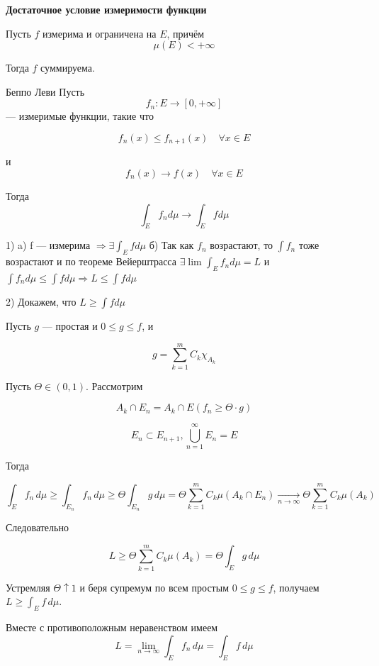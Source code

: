\documentclass[12pt,a4paper]{article}
\begin{document}
\begin{corollary}
    \textbf{Достаточное условие измеримости функции}

    Пусть $f$ измерима и ограничена на $E$, причём
    \[
        \mu(E)<+\infty
    \]

    Тогда $f$ суммируема.
\end{corollary}

\begin{theorem}{Беппо Леви}
    Пусть
    \[
        f_n:E\to[0,+\infty]
    \]
    — измеримые функции, такие что

    \[
        f_n(x)\leq f_{n+1}(x)
        \quad
        \forall x\in E
    \]

    и
    \[
        f_n(x)\to f(x)
        \quad
        \forall x\in E
    \]

    Тогда
    \[
        \int_E f_n d\mu
        \longrightarrow
        \int_E f d\mu
    \]
\end{theorem}

\begin{proofbox}{}

    1) a) f — измерима $\Longrightarrow \exists \int_E fd\mu$
    б) Так как $f_n$ возрастают, то $\int f_n$ тоже возрастают и по теореме Вейерштрасса $\exists \lim\int_E f_nd\mu = L$ и
    $\int f_nd\mu \leq \int fd\mu \Longrightarrow L \leq \int fd\mu$

    2) Докажем, что $L \geq \int fd\mu$

    Пусть $g$ — простая и $0 \leq g \leq f$, и

    \[
        g = \sum_{k=1}^m C_k \chi_{A_k}
    \]

    Пусть $\Theta \in (0, 1) $. Рассмотрим

    \[
        A_k \cap E_n = A_k \cap E(f_n\geq \Theta \cdot g)
    \]

    \[
        E_n \subset E_{n+1}, \bigcup_{n=1}^{\infty}E_n = E
    \]

    Тогда

    \[
        \int_E f_n\,d\mu\geq\int_{E_n}f_n\,d\mu\geq\Theta\int_{E_n}g\,d\mu
        =\Theta\sum_{k=1}^{m}C_k\mu(A_k\cap E_n)
        \xrightarrow[n\to\infty]{}\Theta\sum_{k=1}^{m}C_k\mu(A_k)
    \]

    Следовательно

    \[
        L \geq \Theta\sum_{k=1}^{m}C_k\mu(A_k)=\Theta\int_E g\,d\mu
    \]

    Устремляя $\Theta\uparrow1$ и беря супремум по всем простым $0\leq g\leq f$, получаем $L\geq\int_E f\,d\mu$.

    Вместе с противоположным неравенством имеем
    \[
        L=\lim_{n\to\infty}\int_E f_n\,d\mu=\int_E f\,d\mu
    \]

\end{proofbox}
\end{document}
